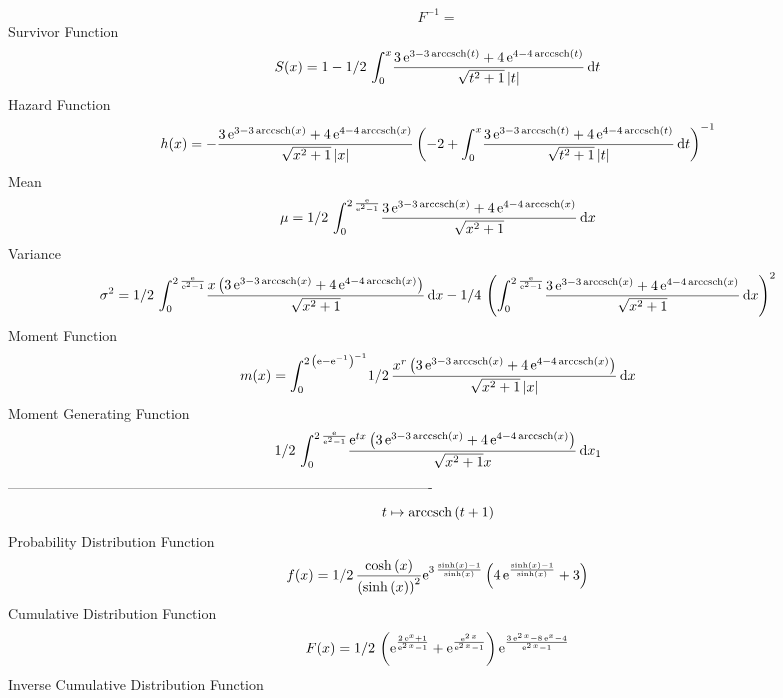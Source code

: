 \documentclass[12pt]{article}
\begin{document}
  $$F^{-1} = $$Survivor Function 
 $$ S(x)=1-1/2\,\int_{0}^{x}\!{\frac {3\,{{\rm e}^{3-3\,{\rm arccsch} \left(t
\right)}}+4\,{{\rm e}^{4-4\,{\rm arccsch} \left(t\right)}}}{\sqrt {{t}
^{2}+1} \left| t \right| }}\,{\rm d}t
$$ Hazard Function 
 $$ h(x)=-{\frac {3\,{{\rm e}^{3-3\,{\rm arccsch} \left(x\right)}}+4\,{{\rm e}^
{4-4\,{\rm arccsch} \left(x\right)}}}{\sqrt {{x}^{2}+1} \left| x
 \right| } \left( -2+\int_{0}^{x}\!{\frac {3\,{{\rm e}^{3-3\,
{\rm arccsch} \left(t\right)}}+4\,{{\rm e}^{4-4\,{\rm arccsch} \left(t
\right)}}}{\sqrt {{t}^{2}+1} \left| t \right| }}\,{\rm d}t \right) ^{-
1}}
$$Mean 
 $$ \mu=1/2\,\int_{0}^{2\,{\frac {{\rm e}}{{{\rm e}^{2}}-1}}}\!{\frac {3\,{
{\rm e}^{3-3\,{\rm arccsch} \left(x\right)}}+4\,{{\rm e}^{4-4\,
{\rm arccsch} \left(x\right)}}}{\sqrt {{x}^{2}+1}}}\,{\rm d}x
$$ Variance 
 $$ \sigma^2 = 1/2\,\int_{0}^{2\,{\frac {{\rm e}}{{{\rm e}^{2}}-1}}}\!{\frac {x
 \left( 3\,{{\rm e}^{3-3\,{\rm arccsch} \left(x\right)}}+4\,{{\rm e}^{
4-4\,{\rm arccsch} \left(x\right)}} \right) }{\sqrt {{x}^{2}+1}}}
\,{\rm d}x-1/4\, \left( \int_{0}^{2\,{\frac {{\rm e}}{{{\rm e}^{2}}-1}
}}\!{\frac {3\,{{\rm e}^{3-3\,{\rm arccsch} \left(x\right)}}+4\,{
{\rm e}^{4-4\,{\rm arccsch} \left(x\right)}}}{\sqrt {{x}^{2}+1}}}
\,{\rm d}x \right) ^{2}
$$Moment Function 
 $$ m(x) = \int_{0}^{2\, \left( {\rm e}-{{\rm e}^{-1}} \right) ^{-1}}\!1/2\,{
\frac {{x}^{r} \left( 3\,{{\rm e}^{3-3\,{\rm arccsch} \left(x\right)}}
+4\,{{\rm e}^{4-4\,{\rm arccsch} \left(x\right)}} \right) }{\sqrt {{x}
^{2}+1} \left| x \right| }}\,{\rm d}x
$$ Moment Generating Function 
 $$1/2\,\int_{0}^{2\,{\frac {{\rm e}}{{{\rm e}^{2}}-1}}}\!{\frac {{
{\rm e}^{tx}} \left( 3\,{{\rm e}^{3-3\,{\rm arccsch} \left(x\right)}}+
4\,{{\rm e}^{4-4\,{\rm arccsch} \left(x\right)}} \right) }{\sqrt {{x}^
{2}+1}x}}\,{\rm d}x_{{1}}
$$-------------------------------------------------------------------------------------------  \\$$t\mapsto {\rm arccsch} \left(t+1\right)
$$Probability Distribution Function 
$$  f(x)=1/2\,{\frac {\cosh \left( x \right) }{ \left( \sinh \left( x \right) 
 \right) ^{2}}{{\rm e}^{3\,{\frac {\sinh \left( x \right) -1}{\sinh
 \left( x \right) }}}} \left( 4\,{{\rm e}^{{\frac {\sinh \left( x
 \right) -1}{\sinh \left( x \right) }}}}+3 \right) }
$$Cumulative Distribution Function  
 $$F(x)=1/2\, \left( {{\rm e}^{{\frac {2\,{{\rm e}^{x}}+1}{{{\rm e}^{2\,x}}-1}
}}}+{{\rm e}^{{\frac {{{\rm e}^{2\,x}}}{{{\rm e}^{2\,x}}-1}}}}
 \right) {{\rm e}^{{\frac {3\,{{\rm e}^{2\,x}}-8\,{{\rm e}^{x}}-4}{{
{\rm e}^{2\,x}}-1}}}}
$$ Inverse Cumulative Distribution Function 
\end{document}
